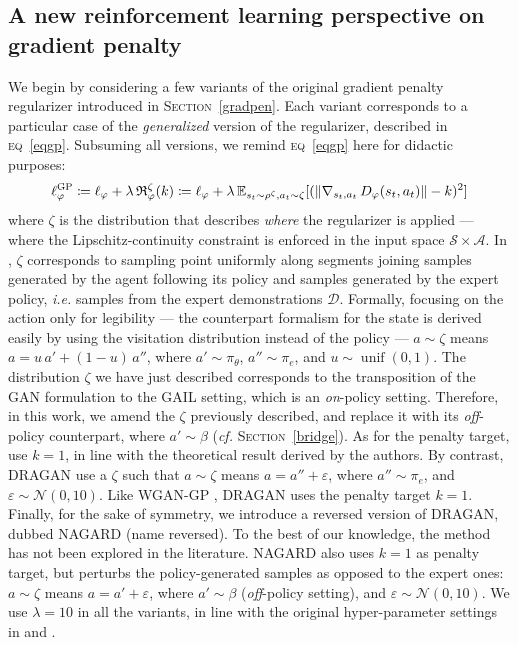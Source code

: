 \subsection{A new reinforcement learning perspective on gradient penalty}
\label{gradpenrl}

We begin by considering a few variants of the original gradient penalty regularizer
\cite{Gulrajani2017-mr}
introduced in \textsc{Section}~\ref{gradpen}.
Each variant corresponds to a particular case of the \emph{generalized} version of the
regularizer, described in \textsc{eq}~\ref{eqgp}.
Subsuming all versions, we remind \textsc{eq}~\ref{eqgp} here for didactic purposes:
\begin{align}
\ell_\varphi^\textsc{GP}
\coloneqq \ell_\varphi + \lambda \, \mathfrak{R}_\varphi^\zeta (k)
\coloneqq \ell_\varphi + \lambda \,
\mathbb{E}_{s_t \sim \rho^{\zeta}, a_t \sim \zeta}
[(\lVert  \nabla _{s_t,a_t} \, D_\varphi(s_t,a_t) \rVert - k )^2]
\end{align}
where $\zeta$ is the distribution that describes \emph{where} the regularizer is applied
--- where the Lipschitz-continuity constraint is enforced in the input space
$\mathcal{S} \times \mathcal{A}$.
In \cite{Gulrajani2017-mr}, $\zeta$ corresponds to sampling point uniformly along segments
joining samples generated by the agent following its policy and samples generated by
the expert policy, \textit{i.e.} samples from the expert demonstrations $\mathcal{D}$.
Formally, focusing on the action only for legibility --- the counterpart formalism
for the state is derived easily by using the visitation distribution instead of the policy ---
$a \sim \zeta$ means $a = u \, a' + (1-u) \, a''$, where $a' \sim \pi_\theta$, $a'' \sim \pi_e$,
and $u \sim \operatorname{unif}(0,1)$.
The distribution $\zeta$ we have just described corresponds to the transposition of the
GAN formulation to the GAIL setting, which is an \emph{on}-policy setting.
Therefore, in this work, we amend the $\zeta$ previously described,
and replace it with its \emph{off}-policy counterpart, where
$a' \sim \beta$ (\textit{cf.} \textsc{Section}~\ref{bridge}).
As for the penalty target, \cite{Gulrajani2017-mr} use $k=1$, in line with the theoretical
result derived by the authors.
By contrast, DRAGAN \cite{Kodali2017-xt} use a $\zeta$ such that
$a \sim \zeta$ means $a = a'' + \varepsilon$, where $a'' \sim \pi_e$,
and $\varepsilon \sim \mathcal{N}(0, 10)$.
Like WGAN-GP \cite{Gulrajani2017-mr}, DRAGAN uses the penalty target $k=1$.
Finally, for the sake of symmetry, we introduce a reversed version of DRAGAN,
dubbed NAGARD (name reversed).
To the best of our knowledge, the method has not been explored in the literature.
NAGARD also uses $k=1$ as penalty target, but perturbs the policy-generated samples
as opposed to the expert ones:
$a \sim \zeta$ means $a = a' + \varepsilon$, where $a' \sim \beta$
(\emph{off}-policy setting),
and $\varepsilon \sim \mathcal{N}(0, 10)$.
We use $\lambda=10$ in all the variants, in line with the original
hyper-parameter settings in \cite{Gulrajani2017-mr} and \cite{Kodali2017-xt}.

